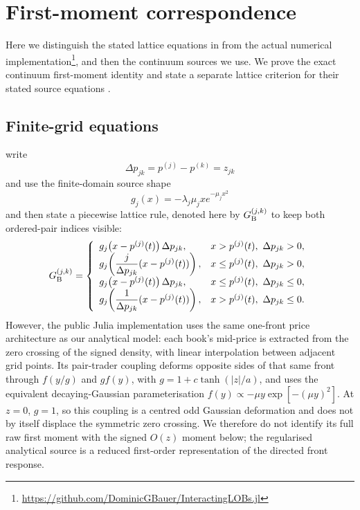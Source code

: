 \documentclass[5p,final]{elsarticle}
\begin{document}
\section{First-moment correspondence}
\label{app:first-moment-correspondence}

Here we distinguish the stated lattice equations in \citet{BauerDianaGebbie2024} from the actual numerical implementation\footnote{\url{https://github.com/DominicGBauer/InteractingLOBs.jl}}, and then the continuum sources we use. We prove the exact continuum first-moment identity and state a separate lattice criterion for their stated source equations \cite{BauerDianaGebbie2024}. 

\subsection{Finite-grid equations}

\citet{BauerDianaGebbie2024} write
\begin{equation}
    \Delta p_{jk}=p^{(j)}-p^{(k)}=z_{jk}
\end{equation}
and use the finite-domain source shape
\begin{equation}
    g_j(x)=-\lambda_j\mu_jx e^{-\mu_jx^2}
\end{equation}
and then state a piecewise lattice rule, denoted here by $G_{\rm B}^{(j,k)}$ to keep both ordered-pair indices visible:
{\scriptsize
\begin{equation}
G_{\rm B}^{(j,k)}=
\left\{
\begin{array}{ll}
g_j\!\left(x-p^{(j)}(t)\right)\Delta p_{jk},
&x>p^{(j)}(t),\ \Delta p_{jk}>0,\\
g_j\!\left(\dfrac{j}{\Delta p_{jk}}(x-p^{(j)}(t))\right),
&x\leq p^{(j)}(t),\ \Delta p_{jk}>0,\\
g_j\!\left(x-p^{(j)}(t)\right)\Delta p_{jk},
&x\leq p^{(j)}(t),\ \Delta p_{jk}\leq0,\\
g_j\!\left(\dfrac{1}{\Delta p_{jk}}(x-p^{(j)}(t))\right),
&x>p^{(j)}(t),\ \Delta p_{jk}\leq0.
\end{array}
\right.
\label{eq:bauer-grid-source}
\end{equation}
}
However, the public Julia implementation uses the same one-front price architecture as our analytical model: each book's mid-price is extracted from the zero crossing of the signed density, with linear interpolation between adjacent grid points. Its pair-trader coupling deforms opposite sides of that same front through $f(y/g)$ and $g f(y)$, with $g=1+c\tanh(|z|/a)$, and uses the equivalent decaying-Gaussian parameterisation $f(y)\propto-\mu y\exp[-(\mu y)^2]$. At $z=0$, $g=1$, so this coupling is a centred odd Gaussian deformation and does not by itself displace the symmetric zero crossing. We therefore do not identify its full raw first moment with the signed $O(z)$ moment below; the regularised analytical source is a reduced first-order representation of the directed front response.
\end{document}
